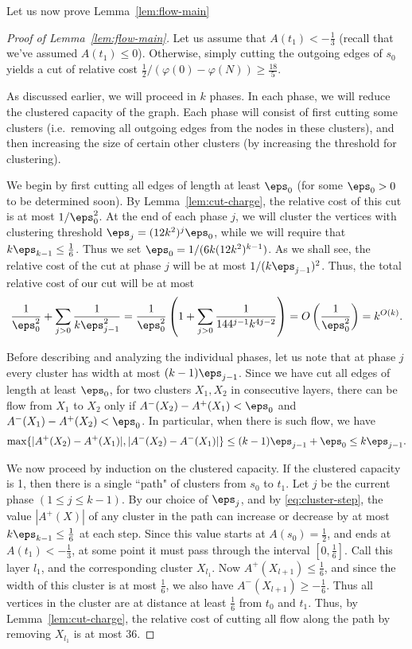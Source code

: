 Let us now prove Lemma~\ref{lem:flow-main}

\begin{proof}[Proof of Lemma~\ref{lem:flow-main}]
Let us assume that $A(t_1)<-\frac13$ (recall that we've assumed $A(t_1)\leq0$). Otherwise, simply cutting the outgoing edges of $s_0$ yields a cut of relative cost $\frac12/(\varphi(0)-\varphi(N))\geq\frac{18}5$.

As discussed earlier, we will proceed in $k$ phases. In each phase, we will reduce the clustered capacity of the graph. Each phase will consist of first cutting some clusters (i.e.\ removing all outgoing edges from the nodes in these clusters), and then increasing the size of certain other clusters (by increasing the threshold for clustering).

We begin by first cutting all edges of length at least $\eps_0$ (for some $\eps_0>0$ to be determined soon). By Lemma~\ref{lem:cut-charge}, the relative cost of this cut is at most $1/\eps_0^2$. At the end of each phase $j$, we will cluster the vertices with clustering threshold $\eps_j=(12k^2)^j\eps_0$, while we will require that $k\eps_{k-1}\leq\frac16$. Thus we set $\eps_0=1/(6k(12k^2)^{k-1})$. As we shall see, the relative cost of the cut at phase $j$ will be  at most $1/(k\eps_{j-1})^2$. Thus, the total relative cost of our cut will be at most $$\frac1{\eps_0^2}+\sum_{j>0}\frac1{k\eps_{j-1}^2}=\frac1{\eps_0^2}\left(1+\sum_{j>0}\frac1{144^{j-1}k^{4j-2}}\right)=O\left(\frac1{\eps_0^2}\right)=k^{O(k)}.$$

Before describing and analyzing the individual phases, let us note that at phase $j$ every cluster has width at most $(k-1)\eps_{j-1}$. Since we have cut all edges of length at least $\eps_0$, for two clusters $X_1,X_2$ in consecutive layers, there can be flow from $X_1$ to $X_2$ only if $A^-(X_2)-A^+(X_1)<\eps_0$ and $A^-(X_1)-A^+(X_2)<\eps_0$. In particular, when there is such flow, we have
\begin{equation}\label{eq:cluster-step}
\max\{|A^+(X_2)-A^+(X_1)|,|A^-(X_2)-A^-(X_1)|\}\leq (k-1)\eps_{j-1}+\eps_0\leq k\eps_{j-1}.
\end{equation}

We now proceed by induction on the clustered capacity. If the clustered capacity is 1, then there is a single ``path" of clusters from $s_0$ to $t_1$. Let $j$ be the current phase $(1\leq j\leq k-1)$. By our choice of $\eps_j$, and by \eqref{eq:cluster-step}, the value $|A^+(X)|$ of any cluster in the path can increase or decrease by at most $k\eps_{k-1}\leq\frac16$ at each step. Since this value starts at $A(s_0)=\frac12$, and ends at $A(t_1)<-\frac13$, at some point it must pass through the interval $[0,\frac16]$. Call this layer $l_1$, and the corresponding cluster $X_{l_1}$. Now $A^+(X_{l+1})\leq\frac16$, and since the width of this cluster is at most $\frac16$, we also have $A^-(X_{l+1})\geq-\frac16$. Thus all vertices in the cluster are at distance at least $\frac16$ from $t_0$ and $t_1$. Thus, by Lemma~\ref{lem:cut-charge}, the relative cost of cutting all flow along the path by removing $X_{l_1}$ is at most 36.


\end{proof}
